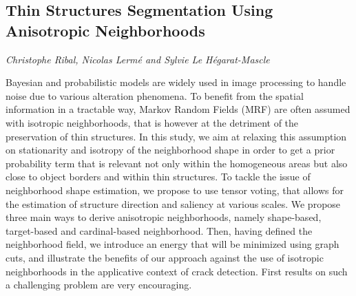 \documentclass[../booklet.tex]{subfiles}
\begin{document}
\subsection[Thin Structures Segmentation Using Anisotropic Neighborhoods. {\it Christophe Ribal, Nicolas Lermé and Sylvie Le Hégarat-Mascle}]{Thin Structures Segmentation Using Anisotropic Neighborhoods}
  

\begin{center}
  {\it Christophe Ribal, Nicolas Lermé and Sylvie Le Hégarat-Mascle}
\end{center}


Bayesian and probabilistic models are widely used in image processing to handle noise due to various alteration phenomena. To benefit from the spatial information in a tractable way, Markov Random Fields (MRF) are often assumed with isotropic neighborhoods, that is however at the
detriment of the preservation of thin structures. In this study, we aim at relaxing this assumption on stationarity and isotropy of the neighborhood shape in order to get a prior probability term that is relevant not only within the homogeneous areas but also close to object borders and within thin structures. To tackle the issue of neighborhood shape estimation, we propose to use tensor voting, that allows for the estimation of structure direction and saliency at various scales. We propose three main ways to derive anisotropic neighborhoods, namely shape-based, target-based and cardinal-based neighborhood. Then, having defined the neighborhood field, we introduce an
energy that will be minimized using graph cuts, and illustrate the benefits of our approach against the use of isotropic neighborhoods in the applicative context of crack detection. First results on such a challenging problem are very encouraging.

\end{document}
